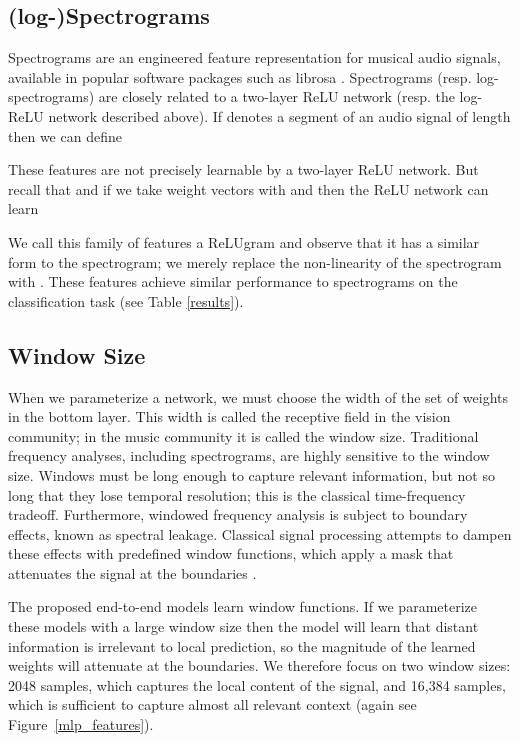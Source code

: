 \documentclass{article} \usepackage{iclr2017_conference,times}
\begin{document}
\subsection{(log-)Spectrograms}\label{spec_section}

Spectrograms are an engineered feature representation for musical audio signals, available in popular software packages such as librosa \citep{librosa}. Spectrograms (resp. log-spectrograms) are closely related to a two-layer ReLU network (resp. the log-ReLU network described above). If  denotes a segment of an audio signal of length  then we can define


These features are not precisely learnable by a two-layer ReLU network. But recall that  and if we take weight vectors  with  and  then the ReLU network can learn

We call this family of features a ReLUgram and observe that it has a similar form to the spectrogram; we merely replace the  non-linearity of the spectrogram with . These features achieve similar performance to spectrograms on the classification task (see Table \ref{results}).

\subsection{Window Size}\label{window_section}

When we parameterize a network, we must choose the width of the set of weights in the bottom layer. This width is called the receptive field in the vision community; in the music community it is called the window size. Traditional frequency analyses, including spectrograms, are highly sensitive to the window size. Windows must be long enough to capture relevant information, but not so long that they lose temporal resolution; this is the classical time-frequency tradeoff. Furthermore, windowed frequency analysis is subject to boundary effects, known as spectral leakage. Classical signal processing attempts to dampen these effects with predefined window functions, which apply a mask that attenuates the signal at the boundaries \citep{rabiner}. 

The proposed end-to-end models learn window functions. If we parameterize these models with a large window size then the model will learn that distant information is irrelevant to local prediction, so the magnitude of the learned weights will attenuate at the boundaries. We therefore focus on two window sizes: 2048 samples, which captures the local content of the signal, and 16,384 samples, which is sufficient to capture almost all relevant context (again see Figure~\ref{mlp_features}).
\end{document}
